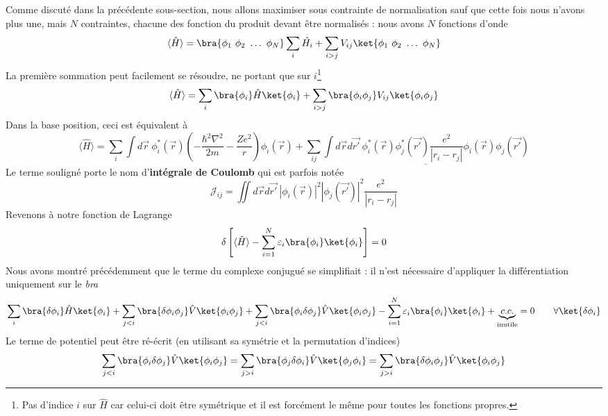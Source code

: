 Comme discuté dans la précédente sous-section, nous allons maximiser sous contrainte de 
normalisation sauf que cette fois nous n'avons plus une, mais $N$ contraintes, chacune 
des fonction du produit devant être normalisés :  nous avons $N$ fonctions d'onde
\begin{equation}
\langle\hat{H}\rangle = \bra{\phi_1\ \phi_2\ \dots\ \phi_N}\sum_i \hat{H_i}+\sum_{i>j}V_{ij}\ket{\phi_1\ \phi_2\ \dots\ \phi_N}
\end{equation}
La première sommation peut facilement se résoudre, ne portant que sur $i$\footnote{Pas d'indice $i$ sur 
$\hat{H}$ car celui-ci doit être symétrique et il est forcément le même pour toutes les fonctions propres.}
\begin{equation}
\langle\hat{H}\rangle = \sum_i\bra{\phi_i}\hat{H}\ket{\phi_i} + \sum_{i>j}\bra{\phi_i\phi_j}V_{ij}\ket{\phi_i\phi_j}
\end{equation}
Dans la base position, ceci est équivalent à
\begin{equation}
\langle\hat{H}\rangle = \sum_i \int d\vec{r}\ \phi_i^*(\vec{r})\left(-\frac{\hbar^2\nabla^2}{2m}-\frac{Ze^2}{r}\right)
\phi_i(\vec{r}) + \sum_{ij} \underline{\int d\vec{r}d\vec{r'}\ \phi_i^*(\vec{r})\phi_j^*(\vec{r'})\frac{e^2}{|r_i-r_j|}\phi_i(\vec{r})\phi_j(\vec{r'})}
\end{equation}
Le terme souligné porte le nom d'\textbf{intégrale de Coulomb} qui est parfois notée
\begin{equation}
\mathcal{J}_{ij} = \iint d\vec{r}d\vec{r'}\ |\phi_i(\vec{r})|^2|\phi_j(\vec{r'})|^2\frac{e^2}{|r_i-r_j|}
\end{equation}
Revenons à notre fonction de Lagrange
\begin{equation}
\delta\left[\langle\hat{H}\rangle - \sum_{i=1}^N \varepsilon_i\bra{\phi_i}\ket{\phi_i} \right] = 0
\end{equation}
 Nous avons montré précédemment que le terme du complexe conjugué se 
simplifiait : il  n'est nécessaire d'appliquer la différentiation uniquement sur le \textit{bra}
\begin{equation}
\sum_i\bra{\delta\phi_i}\hat{H}\ket{\phi_i} + \sum_{j<i} \bra{\delta\phi_i\phi_j}\hat{V}\ket{\phi_i\phi_j}
+ \sum_{j<i} \bra{\phi_i\delta\phi_j}\hat{V}\ket{\phi_i\phi_j} - \sum_{i=1}^N \varepsilon_i\bra{\phi_i}\ket{\phi_i} 
+ \underbrace{c.c.}_{\text{inutile}} = 0\qquad \forall \ket{\delta\phi_i}
\end{equation}
Le terme de potentiel peut être ré-écrit (en utilisant sa symétrie et la permutation d'indices)
\begin{equation}
\sum_{j<i} \bra{\phi_i\delta\phi_j}\hat{V}\ket{\phi_i\phi_j} = \sum_{j>i} \bra{\phi_j\delta\phi_i}\hat{V}\ket{\phi_j\phi_i} = \sum_{j>i} \bra{\delta \phi_i\phi_j}\hat{V}\ket{\phi_i\phi_j}
\end{equation}
